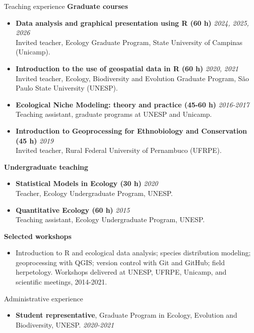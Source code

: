 \documentclass{resume}
\begin{document}
\begin{rSection}{Teaching experience}
\textbf{Graduate courses}
\begin{itemize}
\item \textbf{Data analysis and graphical presentation using R (60 h)} \hfill{\em 2024, 2025, 2026}\\
Invited teacher, Ecology Graduate Program, State University of Campinas (Unicamp).
\item \textbf{Introduction to the use of geospatial data in R (60 h)} \hfill{\em 2020, 2021}\\
Invited teacher, Ecology, Biodiversity and Evolution Graduate Program, São Paulo State University (UNESP).
\item \textbf{Ecological Niche Modeling: theory and practice (45-60 h)} \hfill{\em 2016-2017}\\
Teaching assistant, graduate programs at UNESP and Unicamp.
\item \textbf{Introduction to Geoprocessing for Ethnobiology and Conservation (45 h)} \hfill{\em 2019}\\
Invited teacher, Rural Federal University of Pernambuco (UFRPE).
\end{itemize}

\textbf{Undergraduate teaching}
\begin{itemize}
\item \textbf{Statistical Models in Ecology (30 h)} \hfill{\em 2020}\\
Teacher, Ecology Undergraduate Program, UNESP.
\item \textbf{Quantitative Ecology (60 h)} \hfill{\em 2015}\\
Teaching assistant, Ecology Undergraduate Program, UNESP.
\end{itemize}

\textbf{Selected workshops}
\begin{itemize}
\item Introduction to R and ecological data analysis; species distribution modeling; geoprocessing with QGIS; version control with Git and GitHub; field herpetology. Workshops delivered at UNESP, UFRPE, Unicamp, and scientific meetings, 2014-2021.
\end{itemize}
\end{rSection}

\begin{rSection}{Administrative experience}
\begin{itemize}
\item \textbf{Student representative}, Graduate Program in Ecology, Evolution and Biodiversity, UNESP. \hfill{\em 2020-2021}
\end{itemize}
\end{rSection}
\end{document}
